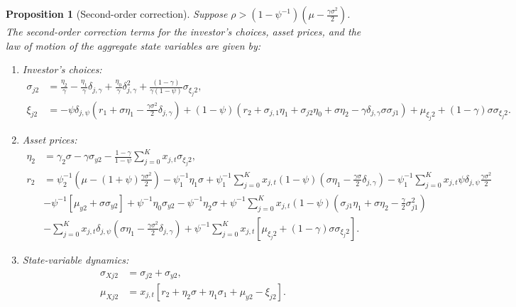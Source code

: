 \documentclass[11pt,english]{article}
\newtheorem{prop}{Proposition}
\begin{document}
\begin{prop}[Second-order correction]
Suppose $\rho > (1-\psi^{-1}) \left(\mu - \frac{\gamma \sigma^2}{2}\right) $. The second-order correction terms for the investor's choices, asset prices, and the law of motion of the aggregate state variables are given by:
\begin{enumerate}
    \item Investor's choices:\small
\begin{align}
    \sigma_{j2} &= \frac{\eta_2}{\gamma} - \frac{\eta_1}{\gamma} \delta_{j,\gamma} + \frac{\eta_0}{\gamma} \delta_{j,\gamma}^2 + \frac{(1-\gamma)}{\gamma(1-\psi)} \sigma_{\xi_j2},\nonumber\\
    \xi_{j2} &= -\psi \delta_{j,\psi} ( r_1 +  \sigma \eta_1 - \frac{\gamma \sigma^2}{2} \delta_{j,\gamma} ) + (1-\psi) (r_2 + \sigma_{j,1} \eta_1 + \sigma_{j2} \eta_0 + \sigma \eta_2 - \gamma \delta_{j,\gamma} \sigma \sigma_{j1})+\mu_{\xi_j2}+(1-\gamma) \sigma \sigma_{\xi_j2}.\nonumber
\end{align}\normalsize
\item Asset prices:
\begin{align}
    \eta_2 &= \gamma_2 \sigma  - \gamma \sigma_{y2} -  \frac{1-\gamma}{1-\psi}\sum_{j=0}^K x_{j,t}  \sigma_{\xi_j2},\\
     r_2 &= \psi_2^{-1} \left(\mu - (1+\psi) \frac{\gamma\sigma^2}{2}  \right)  
    -\psi_1^{-1} \eta_1 \sigma
    +\psi_1^{-1} \sum_{j=0}^K x_{j,t}   (1-\psi) \left( \sigma \eta_1 - \frac{\gamma \sigma}{2}  \delta_{j,\gamma}\right) -\psi_1^{-1} \sum_{j=0}^K x_{j,t}   \psi \delta_{j,\psi} \frac{\gamma \sigma^2}{2}\nonumber\\
    &-\psi^{-1} \left[ \mu_{y2} + \sigma \sigma_{y2} \right]
    +\psi^{-1} \eta_0 \sigma_{y2}- \psi^{-1} \eta_2 \sigma+ \psi^{-1}\sum_{j=0}^K x_{j,t}   (1-\psi) \left(\sigma_{j1}\eta_1 + \sigma \eta_2 - \frac{\gamma}{2}  \sigma_{j1}^2\right)   \\
    &-\sum_{j=0}^K x_{j,t} \delta_{j,\psi} \left( \sigma \eta_1  - \frac{\gamma \sigma^2}{2} \delta_{j,\gamma}    \right)
    + \psi^{-1}\sum_{j=0}^K x_{j,t} \left[ \mu_{\xi_j2}
    + (1-\gamma) \sigma \sigma_{\xi_j2} \right].
\end{align}

\item State-variable dynamics:
\begin{align}
    \sigma_{Xj2} &= \sigma_{j2} + \sigma_{y2},\\
    \mu_{Xj2} &= x_{j,t} \left[ r_2 + \eta_2\sigma + \eta_1 \sigma_1 + \mu_{y2} - \xi_{j2} \right].
\end{align}
\end{enumerate}

\end{prop}
\end{document}
